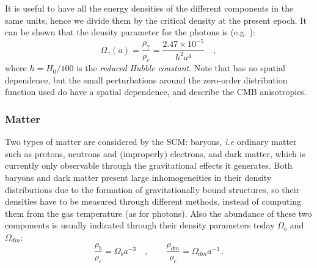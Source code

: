 It is useful to have all the energy densities of the different components in the same units, hence we divide them by the critical density at the present epoch. It can be shown that the density parameter for the photons is (e.g. \citealt{dodelson}):
\begin{equation}
\Omega_{\gamma}(a)=\frac{\rho_{\gamma}}{\rho_c}=\frac{2.47\times 10^ {-5}}{h^2a^4}\quad,\label{omr} 
\end{equation}where $h=H_0/100$ is the \emph{reduced Hubble constant}. Note that  has no spatial dependence, but the small perturbations around the zero-order distribution function used do have a spatial dependence, and describe the CMB anisotropies.

\subsubsection{Matter}
Two types of matter are considered by the SCM: baryons, \emph{i.e} ordinary matter such as protons, neutrons and (improperly) electrons, and dark matter, which is currently only observable through the gravitational effects it generates. Both baryons and dark matter present large inhomogeneities in their density distributions due to the formation of gravitationally bound structures, so their densities have to be measured through different methods, instead of computing them from the gas temperature (as for photons).
Also the abundance of these two components is usually indicated through their density parameters today $\Omega_b$ and $\Omega_{dm}$:
\begin{equation}
\frac{\rho_b}{\rho_c}=\Omega_b a^{-3}\quad,\qquad \frac{\rho_{dm}}{\rho_c}=\Omega_{dm} a^{-3} \,.
\end{equation}%


